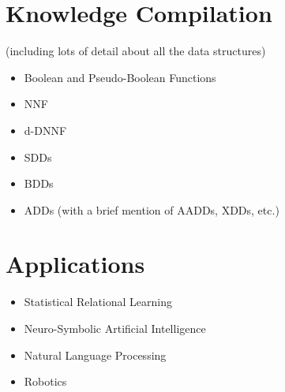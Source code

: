 \section{Knowledge Compilation} \label{sec:kc}

(including lots of detail about all the data structures)
\begin{itemize}
\item Boolean and Pseudo-Boolean Functions
\item NNF
\item d-DNNF
\item SDDs
\item BDDs
\item ADDs (with a brief mention of AADDs, XDDs, etc.)
\end{itemize}

\section{Applications}

\begin{itemize}
\item Statistical Relational Learning
\item Neuro-Symbolic Artificial Intelligence
\item Natural Language Processing
\item Robotics
\end{itemize}
